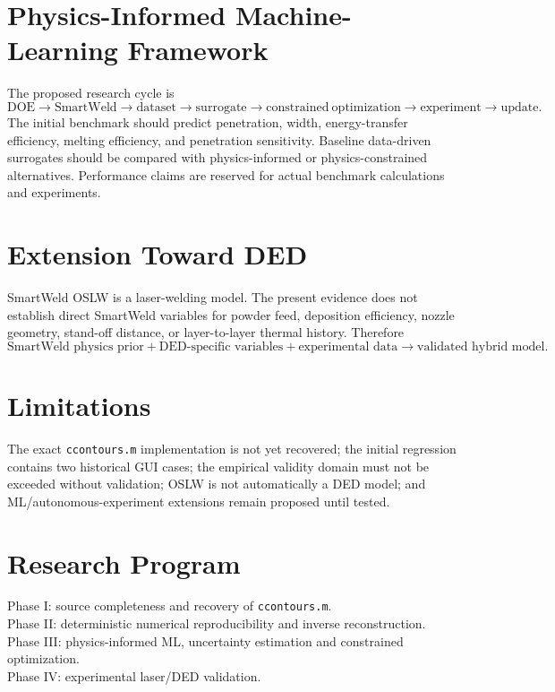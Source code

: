 \documentclass[11pt,a4paper]{article}
\begin{document}
\section{Physics-Informed Machine-Learning Framework}
The proposed research cycle is
\begin{equation}
\boxed{\mathrm{DOE}\rightarrow\mathrm{SmartWeld}\rightarrow
\mathrm{dataset}\rightarrow\mathrm{surrogate}\rightarrow
\mathrm{constrained\ optimization}\rightarrow\mathrm{experiment}\rightarrow
\mathrm{update}}.
\end{equation}
The initial benchmark should predict penetration, width, energy-transfer efficiency,
melting efficiency, and penetration sensitivity. Baseline data-driven surrogates
should be compared with physics-informed or physics-constrained alternatives.
Performance claims are reserved for actual benchmark calculations and experiments.
\section{Extension Toward DED}
SmartWeld OSLW is a laser-welding model. The present evidence does not establish
direct SmartWeld variables for powder feed, deposition efficiency, nozzle geometry,
stand-off distance, or layer-to-layer thermal history. Therefore
\begin{equation}
\text{SmartWeld physics prior}+
\text{DED-specific variables}+
\text{experimental data}
\rightarrow\text{validated hybrid model}.
\end{equation}
\section{Limitations}
The exact \texttt{ccontours.m} implementation is not yet recovered; the initial
regression contains two historical GUI cases; the empirical validity domain must
not be exceeded without validation; OSLW is not automatically a DED model; and
ML/autonomous-experiment extensions remain proposed until tested.
\section{Research Program}
Phase I: source completeness and recovery of \texttt{ccontours.m}.\\
Phase II: deterministic numerical reproducibility and inverse reconstruction.\\
Phase III: physics-informed ML, uncertainty estimation and constrained optimization.\\
Phase IV: experimental laser/DED validation.
\end{document}
